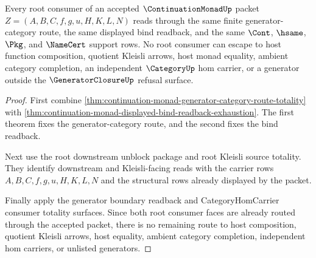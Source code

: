 \begin{theorem}
\label{thm:continuation-monad-root-consumer-nonescape}
Every root consumer of an accepted $\ContinuationMonadUp$ packet $Z=(A,B,C,f,g,u,H,K,L,N)$ reads through the same finite generator-category route, the same displayed bind readback, and the same $\Cont$, $\hsame$, $\Pkg$, and $\NameCert$ support rows. No root consumer can escape to host function composition, quotient Kleisli arrows, host monad equality, ambient category completion, an independent $\CategoryUp$ hom carrier, or a generator outside the $\GeneratorClosureUp$ refusal surface.
\end{theorem}
\begin{proof}
First combine \autoref{thm:continuation-monad-generator-category-route-totality} with \autoref{thm:continuation-monad-displayed-bind-readback-exhaustion}. The first theorem fixes the generator-category route, and the second fixes the bind readback.

Next use the root downstream unblock package and root Kleisli source totality. They identify downstream and Kleisli-facing reads with the carrier rows $A,B,C,f,g,u,H,K,L,N$ and the structural rows already displayed by the packet.

Finally apply the generator boundary readback and CategoryHomCarrier consumer totality surfaces. Since both root consumer faces are already routed through the accepted packet, there is no remaining route to host composition, quotient Kleisli arrows, host equality, ambient category completion, independent hom carriers, or unlisted generators.
\end{proof}
